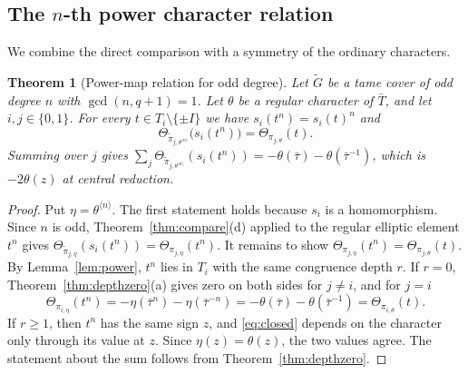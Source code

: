 \documentclass[12pt,letterpaper]{article}
\numberwithin{equation}{section}
\newtheorem{theorem}{Theorem}[section]
\theoremstyle{definition}
\theoremstyle{remark}
\newcommand{\Gt}{\widetilde G}
\begin{document}
\subsection*{The $n$-th power character relation}
We combine the direct comparison with a symmetry of the ordinary characters.

\begin{theorem}[Power-map relation for odd degree]\label{thm:power}
Let $\Gt$ be a tame cover of odd degree $n$ with $\gcd(n,q+1)=1$. Let $\theta$ be a regular character of $\bar T$, and let $i,j\in\{0,1\}$. For every $t\in T_i\setminus\{\pm I\}$ we have $s_i(t^n)=s_i(t)^n$ and
\begin{equation}\label{eq:power}
 \Theta_{\widetilde\pi_{j,\theta^{\langle n\rangle}}}\bigl(s_i(t^n)\bigr)=\Theta_{\pi_{j,\theta}}(t).
\end{equation}
Summing over $j$ gives $\sum_{j}\Theta_{\widetilde\pi_{j,\theta^{\langle n\rangle}}}(s_i(t^n))=-\theta(\bar\tau)-\theta(\bar\tau^{-1})$, which is $-2\theta(z)$ at central reduction.
\end{theorem}
\begin{proof}
Put $\eta=\theta^{\langle n\rangle}$. The first statement holds because $s_i$ is a homomorphism. Since $n$ is odd, Theorem~\ref{thm:compare}(d) applied to the regular elliptic element $t^n$ gives $\Theta_{\widetilde\pi_{j,\eta}}(s_i(t^n))=\Theta_{\pi_{j,\eta}}(t^n)$. It remains to show $\Theta_{\pi_{j,\eta}}(t^n)=\Theta_{\pi_{j,\theta}}(t)$. By Lemma~\ref{lem:power}, $t^n$ lies in $T_i$ with the same congruence depth $r$. If $r=0$, Theorem~\ref{thm:depthzero}(a) gives zero on both sides for $j\ne i$, and for $j=i$
\[
 \Theta_{\pi_{i,\eta}}(t^n)=-\eta(\bar\tau^n)-\eta(\bar\tau^{-n})=-\theta(\bar\tau)-\theta(\bar\tau^{-1})=\Theta_{\pi_{i,\theta}}(t).
\]
If $r\ge1$, then $t^n$ has the same sign $z$, and \eqref{eq:closed} depends on the character only through its value at $z$. Since $\eta(z)=\theta(z)$, the two values agree. The statement about the sum follows from Theorem~\ref{thm:depthzero}.
\end{proof}
\end{document}
